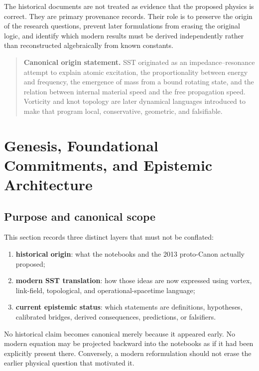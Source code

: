 \documentclass[11pt]{article}
\theoremstyle{definition}
\theoremstyle{plain}
\theoremstyle{remark}
\begin{document}
The historical documents are not treated as evidence that the proposed physics
is correct. They are primary provenance records. Their role is to preserve the
origin of the research questions, prevent later formulations from erasing the
original logic, and identify which modern results must be derived independently
rather than reconstructed algebraically from known constants.

\begin{quote}
\small
\textbf{Canonical origin statement.}
SST originated as an impedance--resonance attempt to explain atomic excitation,
the proportionality between energy and frequency, the emergence of mass from a
bound rotating state, and the relation between internal material speed and the
free propagation speed. Vorticity and knot topology are later dynamical
languages introduced to make that program local, conservative, geometric, and
falsifiable.
\end{quote}

\section{Genesis, Foundational Commitments, and Epistemic Architecture}
\label{sec:genesis_epistemic_architecture}

\subsection{Purpose and canonical scope}
\label{subsec:genesis_scope}

This section records three distinct layers that must not be conflated:
\begin{enumerate}
    \item \textbf{historical origin}: what the notebooks and the 2013
    proto-Canon actually proposed;
    \item \textbf{modern SST translation}: how those ideas are now expressed
    using vortex, link-field, topological, and operational-spacetime language;
    \item \textbf{current epistemic status}: which statements are definitions,
    hypotheses, calibrated bridges, derived consequences, predictions, or
    falsifiers.
\end{enumerate}

No historical claim becomes canonical merely because it appeared early. No
modern equation may be projected backward into the notebooks as if it had been
explicitly present there. Conversely, a modern reformulation should not erase
the earlier physical question that motivated it.
\end{document}
